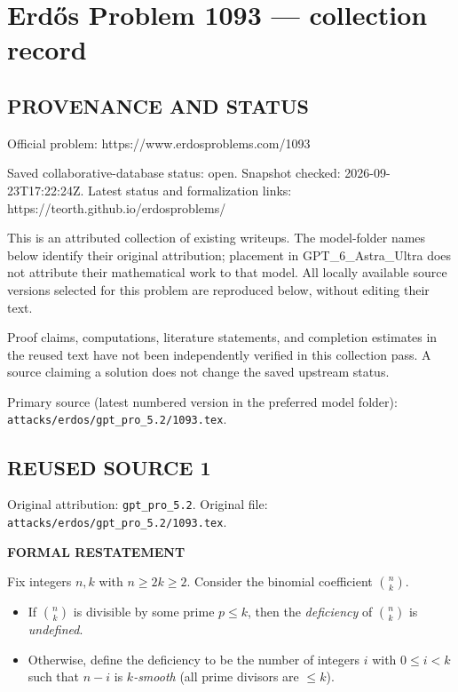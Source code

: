 \section*{Erd\H{o}s Problem 1093 --- collection record}

\subsection*{PROVENANCE AND STATUS}
Official problem: https://www.erdosproblems.com/1093

Saved collaborative-database status: open.
Snapshot checked: 2026-09-23T17:22:24Z.
Latest status and formalization links: https://teorth.github.io/erdosproblems/

This is an attributed collection of existing writeups. The model-folder names below identify their original attribution; placement in GPT\_6\_Astra\_Ultra does not attribute their mathematical work to that model. All locally available source versions selected for this problem are reproduced below, without editing their text.

Proof claims, computations, literature statements, and completion estimates in the reused text have not been independently verified in this collection pass. A source claiming a solution does not change the saved upstream status.

Primary source (latest numbered version in the preferred model folder): \texttt{attacks/erdos/gpt\_pro\_5.2/1093.tex}.

\subsection*{REUSED SOURCE 1}
Original attribution: \texttt{gpt\_pro\_5.2}.
Original file: \texttt{attacks/erdos/gpt\_pro\_5.2/1093.tex}.


\textbf{FORMAL RESTATEMENT}

Fix integers $n,k$ with $n\ge 2k\ge 2$.
Consider the binomial coefficient $\binom{n}{k}$.

\begin{itemize}
\item If $\binom{n}{k}$ is divisible by some prime $p\le k$, then the \emph{deficiency} of $\binom{n}{k}$ is \emph{undefined}.
\item Otherwise, define the deficiency to be the number of integers $i$ with $0\le i<k$ such that $n-i$ is \emph{$k$-smooth} (all prime divisors are $\le k$).
\end{itemize}

